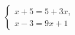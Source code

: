 \begin{ex}
	\begin{condition}
		\( \left\{
		\begin{array}{l}
			x+5=5+3x,\\
			x-3=9x+1
		\end{array}
		\right. \)
	\end{condition}
\end{ex}